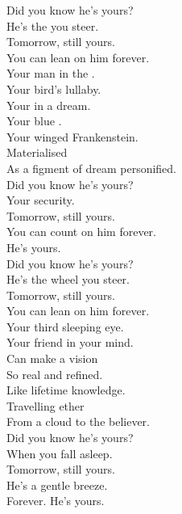 
\label{album:butterfly-3000}





Did you know he's yours? \\
He's the  you steer. \\
Tomorrow, still yours. \\
You can lean on him forever. \\

Your man in the . \\
Your bird's lullaby. \\
Your  in a dream. \\
Your blue . \\
Your winged Frankenstein. \\
Materialised \\
As a figment of dream personified. \\

Did you know he's yours? \\
Your security. \\
Tomorrow, still yours. \\
You can count on him forever. \\

He's yours. \\

Did you know he's yours? \\
He's the wheel you steer. \\
Tomorrow, still yours. \\
You can lean on him forever. \\

Your third sleeping eye. \\
Your friend in your mind. \\
Can make a vision \\
So real and refined. \\
Like lifetime knowledge. \\
Travelling ether \\
From a  cloud to the believer. \\

Did you know he's yours? \\
When you fall asleep. \\
Tomorrow, still yours. \\
He's a gentle breeze. \\
Forever. He's yours. \\

